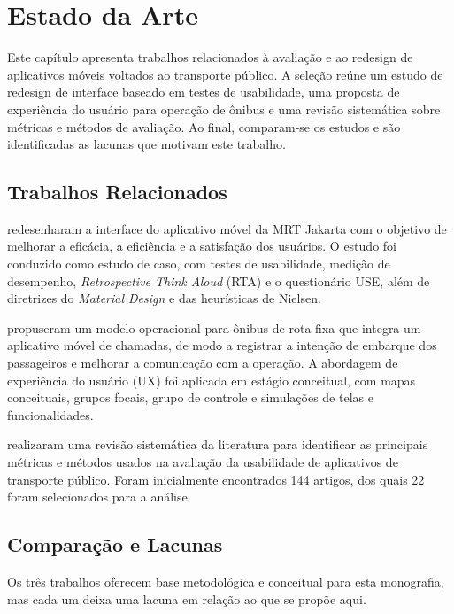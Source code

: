 \chapter[Estado da Arte]{Estado da Arte}\label{capitulo2}

Este capítulo apresenta trabalhos relacionados à avaliação e ao redesign de aplicativos móveis voltados ao transporte público. A seleção reúne um estudo de redesign de interface baseado em testes de usabilidade, uma proposta de experiência do usuário para operação de ônibus e uma revisão sistemática sobre métricas e métodos de avaliação. Ao final, comparam-se os estudos e são identificadas as lacunas que motivam este trabalho.

\section{Trabalhos Relacionados}

 redesenharam a interface do aplicativo móvel da MRT Jakarta com o objetivo de melhorar a eficácia, a eficiência e a satisfação dos usuários. O estudo foi conduzido como estudo de caso, com testes de usabilidade, medição de desempenho, \textit{Retrospective Think Aloud} (RTA) e o questionário USE, além de diretrizes do \textit{Material Design} e das heurísticas de Nielsen.

 propuseram um modelo operacional para ônibus de rota fixa que integra um aplicativo móvel de chamadas, de modo a registrar a intenção de embarque dos passageiros e melhorar a comunicação com a operação. A abordagem de experiência do usuário (UX) foi aplicada em estágio conceitual, com mapas conceituais, grupos focais, grupo de controle e simulações de telas e funcionalidades.

 realizaram uma revisão sistemática da literatura para identificar as principais métricas e métodos usados na avaliação da usabilidade de aplicativos de transporte público. Foram inicialmente encontrados 144 artigos, dos quais 22 foram selecionados para a análise.

\section{Comparação e Lacunas}

Os três trabalhos oferecem base metodológica e conceitual para esta monografia, mas cada um deixa uma lacuna em relação ao que se propõe aqui.

